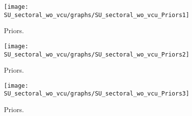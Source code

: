 
\begin{figure}[H]
\centering
\texttt{[image: SU\_sectoral\_wo\_vcu/graphs/SU\_sectoral\_wo\_vcu\_Priors1]}
\caption{Priors.}\label{Fig:Priors:1}
\end{figure}
\begin{figure}[H]
\centering
\texttt{[image: SU\_sectoral\_wo\_vcu/graphs/SU\_sectoral\_wo\_vcu\_Priors2]}
\caption{Priors.}\label{Fig:Priors:2}
\end{figure}
\begin{figure}[H]
\centering
\texttt{[image: SU\_sectoral\_wo\_vcu/graphs/SU\_sectoral\_wo\_vcu\_Priors3]}
\caption{Priors.}\label{Fig:Priors:3}
\end{figure}
 
